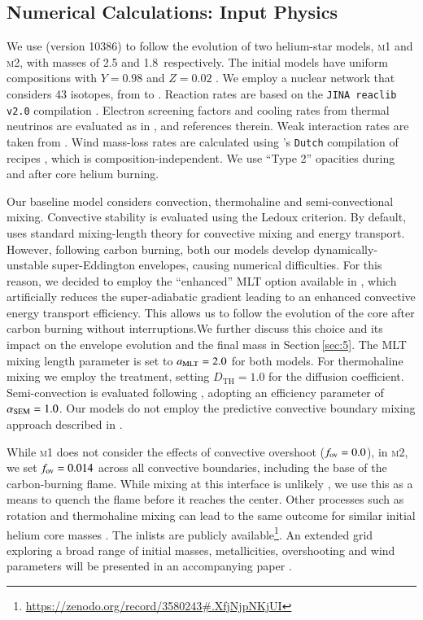 \documentclass[twocolumn]{aa}
\begin{document}
\subsection{Numerical Calculations: Input Physics}\label{sec:2.1}
We use \mesa (version 10386) to follow the evolution of two helium-star models, \textsc{m1} and \textsc{m2}, with  masses of 2.5 and 1.8\msun\ respectively. 
The initial models have uniform compositions with $Y=0.98$ and $Z=0.02$ \citep[solar abundances are taken from ][]{grevesse1998}. We employ a nuclear network that considers 43  isotopes, from  to . Reaction rates are based on the \texttt{JINA reaclib v2.0} compilation \citep{cyburt2010}. Electron screening factors and cooling rates from thermal neutrinos are evaluated as in \cite{Farmer:2015afs}, and references therein. 
Weak interaction rates are taken from \cite{Suzuki:2015iry}. 
Wind mass-loss rates are calculated using \mesa's \texttt{Dutch} compilation of recipes  \citep{Paxton:2013pj},  which is composition-independent. We use ``Type 2'' opacities during and after core helium burning.

Our baseline  model considers convection, thermohaline and semi-convectional mixing. Convective stability is 
evaluated using the Ledoux criterion. By default, \mesa uses  standard mixing-length theory  \citep[MTL;][]{cox1968} for convective mixing and energy transport. However, following carbon burning, both our models develop 
dynamically-unstable super-Eddington envelopes, causing numerical 
difficulties. For this reason, we decided to employ the ``enhanced'' MLT 
option available in \mesa \citep{Paxton:2013pj}, which artificially reduces 
the super-adiabatic gradient leading to  an enhanced convective energy 
transport efficiency.  This  allows us to follow the evolution of the core 
after carbon burning without interruptions.We further discuss this choice and its impact on the envelope evolution and the final mass in Section\,\ref{sec:5}. 
The MLT mixing length parameter is set to $a_{\rm MLT}=2.0$ for both models. For 
thermohaline mixing we employ 
the \cite{kippenhahn1980} 
 treatment, setting $D_{\text{TH}} = 1.0$ for the diffusion coefficient. Semi-convection is evaluated following \cite{langer1983}, adopting an efficiency parameter of $\alpha_{{\rm SEM}} = 1.0$. Our models do not employ the predictive convective boundary mixing approach described in \cite{Paxton:2017eie}. 

While \textsc{m1} does not consider the effects of convective overshoot ($f_{\rm ov}=0.0$), in \textsc{m2}, we set $f_{\rm ov}=0.014$ across all convective boundaries, including the base of the 
carbon-burning flame. While mixing at this interface is unlikely \citep{lecoanet2016}, 
we use this as a means to  quench the flame before it reaches the center.  
Other processes such as rotation and thermohaline mixing can lead to the 
same outcome for similar initial helium core masses \citep{Farmer:2015afs}.
The \mesa inlists are publicly available\footnote{\url{https://zenodo.org/record/3580243#.XfjNjpNKjUI}}. 
An  extended grid exploring a broad range of initial masses, 
metallicities, overshooting and wind parameters will be presented in an 
accompanying paper \citep{chanlaridis2019}.       
\end{document}
